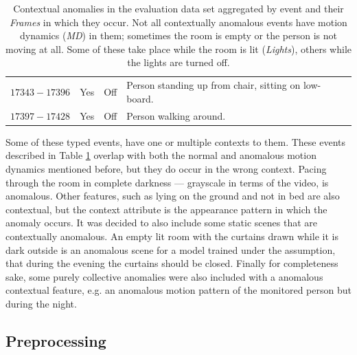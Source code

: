 \begin{table}
\begin{tabular}{ | l | c | c | p{9.5cm} |}
	$17343 - 17396$ & Yes & Off & Person standing up from chair, sitting on low-board. \\
	$17397 - 17428$ & Yes & Off & Person walking around. \\
	\bottomrule
	\end{tabular}
	\caption[Contextual anomalies in the evaluation data set.]{Contextual anomalies in the evaluation data set aggregated by event and their \textit{Frames} in which they occur. Not all contextually anomalous events have motion dynamics (\textit{MD}) in them; sometimes the room is empty or the person is not moving at all. Some of these take place while the room is lit (\textit{Lights}), others while the lights are turned off.}
	\label{tab:dataset_c_anomaly}
\end{table}

Some of these typed events, have one or multiple contexts to them. These events described in Table \ref{tab:dataset_c_anomaly} overlap with both the normal and anomalous motion dynamics mentioned before, but they do occur in the wrong context. Pacing through the room in complete darkness --- grayscale in terms of the video, is anomalous. Other features, such as lying on the ground and not in bed are also contextual, but the context attribute is the appearance pattern in which the anomaly occurs. It was decided to also include some static scenes that are contextually anomalous. An empty lit room with the curtains drawn while it is dark outside is an anomalous scene for a model trained under the assumption, that during the evening the curtains should be closed. Finally for completeness sake, some purely collective anomalies were also included with a anomalous contextual feature, e.g.  an anomalous motion pattern of the monitored person but during the night. 


\subsection{Preprocessing} \label{subsec:dataset_preprocessing}

